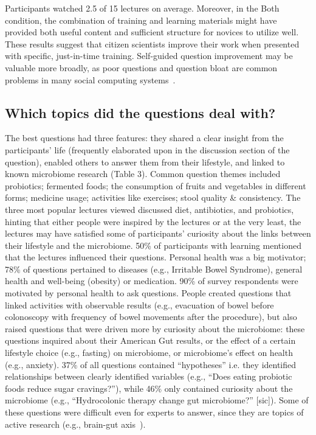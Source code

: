 Participants watched 2.5 of 15 lectures on average. Moreover, in the Both condition, the combination of training and learning materials might have provided both useful content and sufficient structure for novices to utilize well. These results suggest that citizen scientists improve their work when presented with specific, just-in-time training. Self-guided question improvement may be valuable more broadly, as poor questions and question bloat are common problems in many social computing systems~\cite{Yang:2014:ARQ:2631775.2631809}.

\subsection{Which topics did the questions deal with?}
The best questions had three features: they shared a clear insight from the participants’ life (frequently elaborated upon in the discussion section of the question), enabled others to answer them from their lifestyle, and linked to known microbiome research (Table 3). Common question themes included probiotics; fermented foods; the consumption of fruits and vegetables in different forms; medicine usage; activities like exercises; stool quality \& consistency. The three most popular lectures viewed discussed diet, antibiotics, and probiotics, hinting that either people were inspired by the lectures or at the very least, the lectures may have satisfied some of participants’ curiosity about the links between their lifestyle and the microbiome. 50\% of participants with learning mentioned that the lectures influenced their questions.
Personal health was a big motivator; 78\% of questions pertained to diseases (e.g., Irritable Bowel Syndrome), general health and well-being (obesity) or medication. 90\% of survey respondents were motivated by personal health to ask questions. People created questions that linked activities with observable results (e.g., evacuation of bowel before colonoscopy with frequency of bowel movements after the procedure), but also raised questions that were driven more by curiosity about the microbiome: these questions inquired about their American Gut results, or the effect of a certain lifestyle choice (e.g., fasting) on microbiome, or microbiome’s effect on health (e.g., anxiety). 37\% of all questions contained “hypotheses” i.e. they identified relationships between clearly identified variables (e.g., “Does eating probiotic foods reduce sugar cravings?”), while 46\% only contained curiosity about the microbiome (e.g., “Hydrocolonic therapy change gut microbiome?” [sic]). Some of these questions were difficult even for experts to answer, since they are topics of active research (e.g., brain-gut axis~\cite{Mayer15490}).

